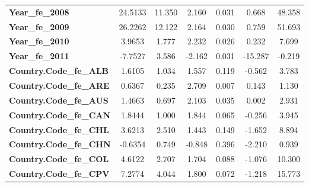 \begin{center}
\begin{tabular}{lcccccc}
\textbf{Year\_fe\_2008}                                            &      24.5133  &       11.350     &     2.160  &         0.031        &        0.668    &       48.358     \\
\textbf{Year\_fe\_2009}                                            &      26.2262  &       12.122     &     2.164  &         0.030        &        0.759    &       51.693     \\
\textbf{Year\_fe\_2010}                                            &       3.9653  &        1.777     &     2.232  &         0.026        &        0.232    &        7.699     \\
\textbf{Year\_fe\_2011}                                            &      -7.7527  &        3.586     &    -2.162  &         0.031        &      -15.287    &       -0.219     \\
\textbf{Country.Code\_fe\_ALB}                                     &       1.6105  &        1.034     &     1.557  &         0.119        &       -0.562    &        3.783     \\
\textbf{Country.Code\_fe\_ARE}                                     &       0.6367  &        0.235     &     2.709  &         0.007        &        0.143    &        1.130     \\
\textbf{Country.Code\_fe\_AUS}                                     &       1.4663  &        0.697     &     2.103  &         0.035        &        0.002    &        2.931     \\
\textbf{Country.Code\_fe\_CAN}                                     &       1.8444  &        1.000     &     1.844  &         0.065        &       -0.256    &        3.945     \\
\textbf{Country.Code\_fe\_CHL}                                     &       3.6213  &        2.510     &     1.443  &         0.149        &       -1.652    &        8.894     \\
\textbf{Country.Code\_fe\_CHN}                                     &      -0.6354  &        0.749     &    -0.848  &         0.396        &       -2.210    &        0.939     \\
\textbf{Country.Code\_fe\_COL}                                     &       4.6122  &        2.707     &     1.704  &         0.088        &       -1.076    &       10.300     \\
\textbf{Country.Code\_fe\_CPV}                                     &       7.2774  &        4.044     &     1.800  &         0.072        &       -1.218    &       15.773     \\

\end{tabular}
\end{center}
